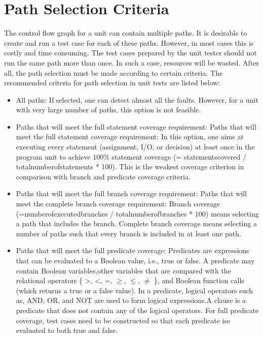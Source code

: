 \section{Path Selection Criteria}
The control flow graph for a unit can contain multiple paths. It is desirable to create and run a test case for each of these paths. However, in most cases this is costly and time consuming. The test cases prepared by the unit tester should not run the same path more than once. In such a case, resources will be wasted. After all, the path selection must be made according to certain criteria. The recommended criteria for path selection in unit tests are listed below:
\begin{itemize}
        \item All paths: If selected, one can detect almost all the faults. However, for a unit with very large number of paths, this option is not feasible. 
        \item Paths that will meet the full statement coverage requirement: Paths that will meet the full statement coverage requirement: In this option, one aims at executing every statement (assignment, I/O, or decision) at least once in the program unit to achieve 100\% statement coverage (= statementscovered / totalnumberofstatements * 100). This is the weakest coverage criterion in comparison with branch and predicate coverage criteria.
        \item Paths that will meet the full branch coverage requirement: Paths that will meet the complete branch coverage requirement: Branch coverage (=numberofexecutedbranches / totalnumberofbranches * 100) means selecting a path that includes the branch. Complete branch coverage means selecting a number of paths such that every branch is included in at least one path.
        \item Paths that will meet the full predicate coverage: Predicates are expressions that can be evaluated to a Boolean value, i.e., true or false. A predicate may contain Boolean variables,other variables that are compared with the relational operators \{ >, <, =, $\geq$, $\leq$, $\neq$ \}, and Boolean function calls (which returns a true or a false value). In a predicate, logical operators such as, AND, OR, and NOT are used to form logical expressions.A clause is a predicate that does not contain any of the logical operators. For full predicate coverage, test cases need to be constructed so that each predicate ise evaluated to both true and false. 
\end{itemize}

